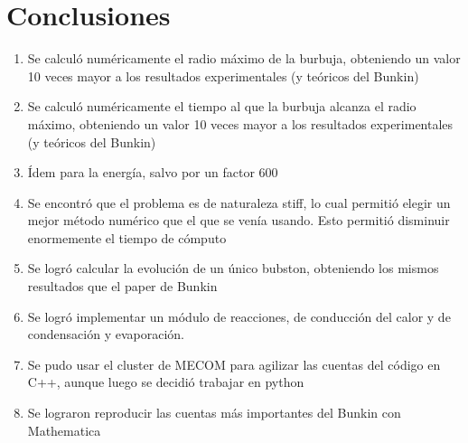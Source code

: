 \documentclass[aps,prb,twocolumn,superscriptaddress,floatfix,longbibliography,10pt]{revtex4-2}
\newcounter{para}
\begin{document}
\section*{Conclusiones}
\begin{enumerate}
  \item Se calculó numéricamente el radio máximo de la burbuja, obteniendo un valor 10 veces mayor a los resultados experimentales (y teóricos del Bunkin)
  \item Se calculó numéricamente el tiempo al que la burbuja alcanza el radio máximo, obteniendo un valor 10 veces mayor a los resultados experimentales (y teóricos del Bunkin)
  \item Ídem para la energía, salvo por un factor 600
  \item Se encontró que el problema es de naturaleza stiff, lo cual permitió elegir un mejor método numérico que el que se venía usando. Esto permitió disminuir enormemente el tiempo de cómputo
  \item Se logró calcular la evolución de un único bubston, obteniendo los mismos resultados que el paper de Bunkin
  \item Se logró implementar un módulo de reacciones, de conducción del calor y de condensación y evaporación.
  \item Se pudo usar el cluster de MECOM para agilizar las cuentas del código en C++, aunque luego se decidió trabajar en python
  \item Se lograron reproducir las  cuentas más importantes del Bunkin con Mathematica



\end{enumerate}





\end{document}
